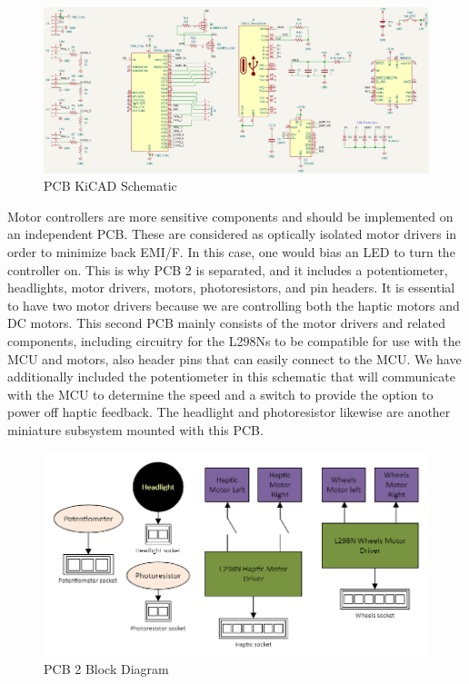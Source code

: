 \begin{figure}[H]
	\centering
	\includegraphics[width=\textwidth]{./Images/PCB1-sch.png}
	\caption{\label{fig:pcb-sch}PCB KiCAD Schematic}
\end{figure}

\noindent Motor controllers are more sensitive components and should be implemented on an independent PCB. These are considered as optically isolated motor drivers in order to minimize back EMI/F. In this case, one would bias an LED to turn the controller on. This is why PCB 2 is separated, and it includes a potentiometer, headlights, motor drivers, motors, photoresistors, and pin headers. It is essential to have two motor drivers because we are controlling both the haptic motors and DC motors. This second PCB mainly consists of the motor drivers and related components, including circuitry for the L298Ns to be compatible for use with the MCU and motors, also header pins that can easily connect to the MCU. We have additionally included the potentiometer in this schematic that will communicate with the MCU to determine the speed and a switch to provide the option to power off haptic feedback. The headlight and photoresistor likewise are another miniature subsystem mounted with this PCB. \\

\begin{figure}[H]
	\centering
	\includegraphics[width=\textwidth]{./Images/pcb2-block2.png}
	\caption{\label{fig:pcb2}PCB 2 Block Diagram}
\end{figure}

